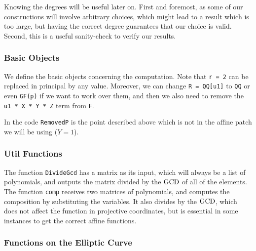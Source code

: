 Knowing the degrees will be useful later on.
First and foremost, as some of our constructions will involve arbitrary choices, which might lead to a result which is too large, but having the correct degree guarantees that our choice is valid.
Second, this is a useful sanity-check to verify our results. 

\subsubsection{Basic Objects}

We define the basic objects concerning the computation.
Note that \texttt{r = 2} can be replaced in principal by any value.	
Moreover, we can change \texttt{R = QQ[u1]} to \texttt{QQ} or even \texttt{GF(p)} if we want to work over them, and then we also need to remove the \texttt{u1 * X * Y * Z} term from \texttt{F}.

In the code \texttt{RemovedP} is the point described above which is not in the affine patch we will be using ($Y = 1$).

\subsubsection{Util Functions}

The function \texttt{DivideGcd} has a matrix as its input, which will always be a list of polynomials, and outputs the matrix divided by the $\operatorname{GCD}$ of all of the elements.
The function \texttt{comp} receives two matrices of polynomials, and computes the composition by substituting the variables.
It also divides by the $\operatorname{GCD}$, which does not affect the function in projective coordinates, but is essential in some instances to get the correct affine functions.

\subsubsection{Functions on the Elliptic Curve}

